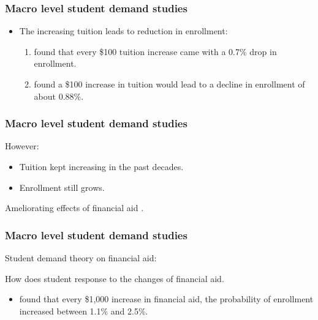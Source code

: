 \documentclass[aspectratio=169]{beamer}
\begin{document}
\begin{frame}
    \frametitle{Macro level student demand studies}

\begin{itemize}
  \item The increasing tuition leads to reduction in enrollment:
  


\begin{enumerate}
  \item \citet{Leslie1987} found that every \$100 tuition increase came 
  with a 0.7\% drop in enrollment.
\item \citet{Crouse2015} found a \$100 
increase in tuition would lead to a decline in enrollment of about 0.88\%. 

\end{enumerate}


\end{itemize}

\end{frame}


\begin{frame}
  \frametitle{Macro level student demand studies}
    However:
  \begin{itemize}
    \item  Tuition kept increasing in the past decades.
    \item Enrollment still grows.
    
  \end{itemize}
  
 Ameliorating effects of financial aid \citep{Leslie1987}.
  
\end{frame}



\begin{frame}
    \frametitle{Macro level student demand studies}
 Student demand theory on financial aid:
 
How does student response to the changes of financial aid.
\begin{itemize}
\item  \citet{Braunstein1999} found that every \$1,000 increase in
financial aid, the probability of enrollment increased between 1.1\% and
2.5\%.

 \end{itemize}
 
 \end{frame}
\end{document}
